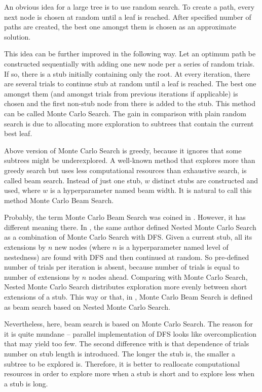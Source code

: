 \documentclass{article}
\begin{document}
An obvious idea for a large tree is to use random search. To create a path, every next node is chosen at random until a leaf is reached. After specified number of paths are created, the best one amongst them is chosen as an approximate solution.

This idea can be further improved in the following way. Let an optimum path be constructed sequentially with adding one new node per a series of random trials. If so, there is a stub initially containing only the root. At every iteration, there are several trials to continue stub at random until a leaf is reached. The best one amongst them (and amongst trials from previous iterations if applicable) is chosen and the first non-stub node from there is added to the stub. This method can be called Monte Carlo Search. The gain in comparison with plain random search is due to allocating more exploration to subtrees that contain the current best leaf.

Above version of Monte Carlo Search is greedy, because it ignores that some subtrees might be underexplored. A well-known method that explores more than greedy search but uses less computational resources than exhaustive search, is called beam search. Instead of just one stub, $w$ distinct stubs are constructed and used, where $w$ is a hyperparameter named beam width. It is natural to call this method Monte Carlo Beam Search.

Probably, the term Monte Carlo Beam Search was coined in \cite{cazenave2012beam}. However, it has different meaning there. In \cite{cazenave2009nested}, the same author defined Nested Monte Carlo Search as a combination of Monte Carlo Search with DFS. Given a current stub, all its extensions by $n$ new nodes (where $n$ is a hyperparameter named level of nestedness) are found with DFS and then continued at random. So pre-defined number of trials per iteration is absent, because number of trials is equal to number of extensions by $n$ nodes ahead. Comparing with Monte Carlo Search, Nested Monte Carlo Search distributes exploration more evenly between short extensions of a stub. This way or that, in \cite{cazenave2012beam}, Monte Carlo Beam Search is defined as beam search based on Nested Monte Carlo Search.

Nevertheless, here, beam search is based on Monte Carlo Search. The reason for it is quite mundane -- parallel implementation of DFS looks like overcomplication that may yield too few. The second difference with \cite{cazenave2012beam} is that dependence of trials number on stub length is introduced. The longer the stub is, the smaller a subtree to be explored is. Therefore, it is better to reallocate computational resources in order to explore more when a stub is short and to explore less when a stub is long.
\end{document}
